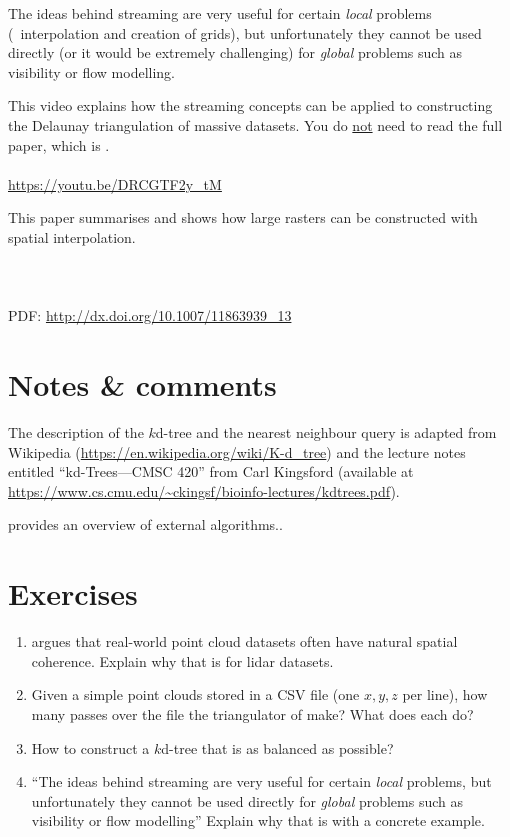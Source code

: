 The ideas behind streaming are very useful for certain \emph{local} problems (\eg\ interpolation and creation of grids), but unfortunately they cannot be used directly (or it would be extremely challenging) for \emph{global} problems such as visibility or flow modelling.


\begin{link-box}
  This video explains how the streaming concepts can be applied to constructing the Delaunay triangulation of massive datasets.
  You do \underline{not} need to read the full paper, which is \citet{Isenburg06}.
  \\ \\
  \url{https://youtu.be/DRCGTF2y_tM}
\end{link-box}

\begin{link-box}
  This paper summarises \citet{Isenburg06} and shows how large rasters can be constructed with spatial interpolation.
  \\ \\
  \\ \\
  PDF: \url{http://dx.doi.org/10.1007/11863939_13}
\end{link-box}


%
\section{Notes \& comments}

The description of the $k$d-tree and the nearest neighbour query is adapted from Wikipedia (\url{https://en.wikipedia.org/wiki/K-d_tree}) and the lecture notes entitled ``kd-Trees---CMSC 420'' from Carl Kingsford (available at \url{https://www.cs.cmu.edu/~ckingsf/bioinfo-lectures/kdtrees.pdf}).

\citep{Vitter01} provides an overview of external algorithms..


%
\section{Exercises}

\begin{enumerate}
  \item \citet{Isenburg06-1} argues that real-world point cloud datasets often have natural spatial coherence. Explain why that is for lidar datasets.
  \item Given a simple point clouds stored in a CSV file (one $x,y,z$ per line), how many passes over the file the triangulator of \citet{Isenburg06-1} make? What does each do?
  \item How to construct a $k$d-tree that is as balanced as possible?
  \item ``The ideas behind streaming are very useful for certain \emph{local} problems, but unfortunately they cannot be used directly for \emph{global} problems such as visibility or flow modelling'' Explain why that is with a concrete example.
\end{enumerate}
